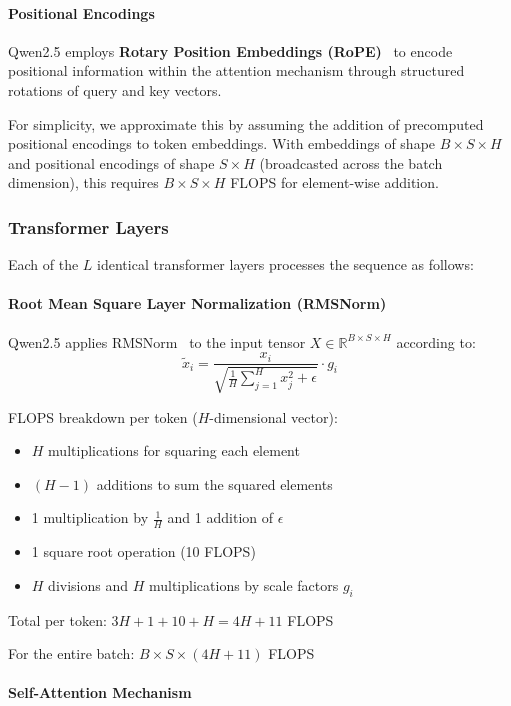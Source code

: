 \documentclass[11pt]{article}
\begin{document}
\paragraph{Positional Encodings} 
Qwen2.5 employs \textbf{Rotary Position Embeddings (RoPE)}~\cite{su2023roformerenhancedtransformerrotary} to encode positional information within the attention mechanism through structured rotations of query and key vectors.

For simplicity, we approximate this by assuming the addition of precomputed positional encodings to token embeddings. With embeddings of shape $B\times S \times H$ and positional encodings of shape $S \times H$ (broadcasted across the batch dimension), this requires $B \times S \times H$ FLOPS for element-wise addition.


\subsubsection{Transformer Layers}

Each of the $L$ identical transformer layers processes the sequence as follows:

\paragraph{Root Mean Square Layer Normalization (RMSNorm)}
Qwen2.5 applies RMSNorm~\cite{zhang2019rootmeansquarelayer} to the input tensor $X \in \mathbb{R}^{B \times S \times H}$ according to:
\[
\tilde{x}_i = \frac{x_i}{\sqrt{\frac{1}{H} \sum_{j=1}^H x_j^2 + \epsilon}} \cdot g_i
\]

FLOPS breakdown per token ($H$-dimensional vector):
\begin{itemize}
    \item $H$ multiplications for squaring each element
    \item $(H-1)$ additions to sum the squared elements
    \item 1 multiplication by $\frac{1}{H}$ and 1 addition of $\epsilon$
    \item 1 square root operation (10 FLOPS)
    \item $H$ divisions and $H$ multiplications by scale factors $g_i$
\end{itemize}

Total per token: $3H + 1 + 10 + H = 4H + 11$ FLOPS

For the entire batch: $B \times S \times (4H + 11)$ FLOPS

\paragraph{Self-Attention Mechanism}
\end{document}
